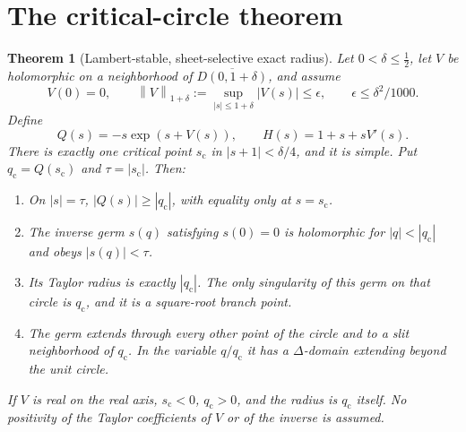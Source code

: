 \documentclass[11pt,a4paper]{article}
\numberwithin{equation}{section}
\newtheorem{theorem}{Theorem}[section]
\theoremstyle{definition}
\theoremstyle{remark}
\newcommand{\scv}{s_{\mathrm c}}
\newcommand{\qcv}{q_{\mathrm c}}
\newcommand{\norm}[1]{\left\lVert#1\right\rVert}
\begin{document}
\section{The critical-circle theorem}
\label{sec:main}
\begin{theorem}[Lambert-stable, sheet-selective exact radius]
\label{thm:lambert}
Let $0<\delta\leq\tfrac12$, let $V$ be holomorphic on a neighborhood of $\overline{D(0,1+\delta)}$, and assume
\begin{equation}
 V(0)=0,\qquad
 \norm{V}_{1+\delta}:=\sup_{|s|\leq1+\delta}|V(s)|
 \leq\epsilon,\qquad \epsilon\leq\delta^2/1000.
 \label{eq:smallV}
\end{equation}
Define
\begin{equation}
 Q(s)=-s\exp(s+V(s)),\qquad
 H(s)=1+s+sV'(s).
 \label{eq:QH}
\end{equation}
There is exactly one critical point $\scv$ in $|s+1|<\delta/4$, and it is simple. Put $\qcv=Q(\scv)$ and $\tau=|\scv|$. Then:
\begin{enumerate}[label=(\roman*),leftmargin=2em]
\item On $|s|=\tau$, $|Q(s)|\geq|\qcv|$, with equality only at $s=\scv$.
\item The inverse germ $s(q)$ satisfying $s(0)=0$ is holomorphic for $|q|<|\qcv|$ and obeys $|s(q)|<\tau$.
\item Its Taylor radius is exactly $|\qcv|$. The only singularity of this germ on that circle is $\qcv$, and it is a square-root branch point.
\item The germ extends through every other point of the circle and to a slit neighborhood of $\qcv$. In the variable $q/\qcv$ it has a $\Delta$-domain extending beyond the unit circle.
\end{enumerate}
If $V$ is real on the real axis, $\scv<0$, $\qcv>0$, and the radius is $\qcv$ itself. No positivity of the Taylor coefficients of $V$ or of the inverse is assumed.
\end{theorem}
\end{document}
